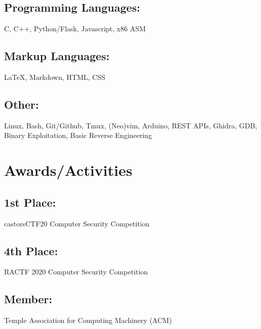 \documentclass{article}
\begin{document}
\subsection{Programming Languages:}
C, C++, Python/Flask, Javascript, x86 ASM
\subsection{Markup Languages:}
{\LaTeX}, Markdown, HTML, CSS
\subsection{Other:}
Linux, Bash, Git/Github, Tmux, (Neo)vim, Arduino, REST APIs, Ghidra, GDB, Binary Exploitation, Basic Reverse Engineering

\section{Awards/Activities}
\subsection{1st Place: } castorsCTF20 Computer Security Competition
\subsection{4th Place: } RACTF 2020 Computer Security Competition
\subsection{Member: } Temple Association for Computing Machinery (ACM)
\end{document}
